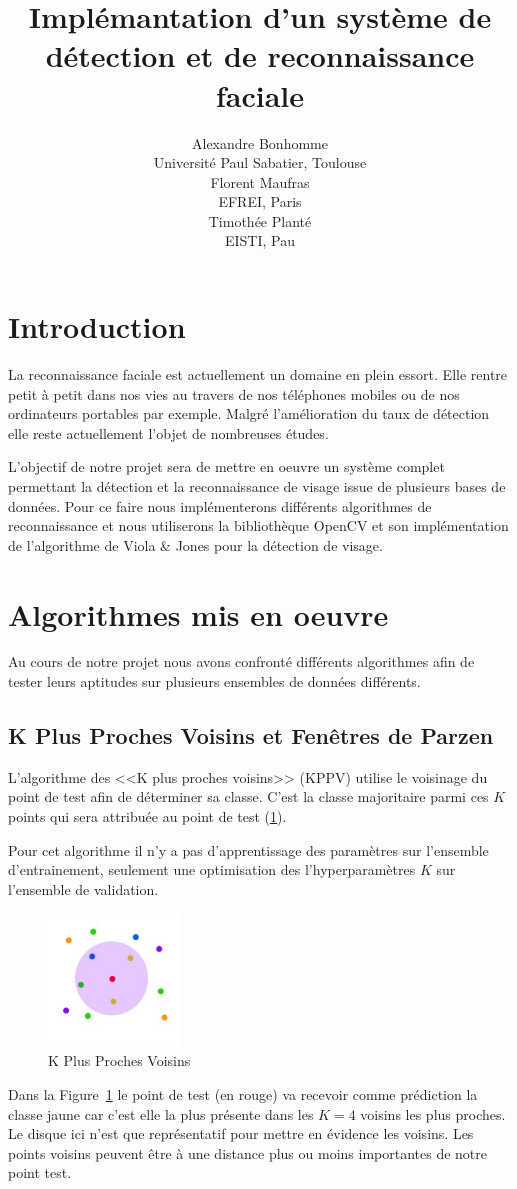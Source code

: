 \documentclass[a4paper,10pt,twocolumn]{extarticle}
\title{\textsf{Implémantation d’un système de détection et de reconnaissance faciale}}
\author{Alexandre Bonhomme\\ {\normalsize Université Paul Sabatier, Toulouse}\\
Florent Maufras\\ {\normalsize EFREI, Paris}\\
Timothée Planté\\ {\normalsize EISTI, Pau}\\}%
\date{}
\begin{document}
\maketitle
\section{Introduction}
La reconnaissance faciale est actuellement un domaine en plein essort. Elle rentre petit à petit dans nos vies au travers de nos téléphones mobiles ou de nos ordinateurs portables par exemple. Malgré l'amélioration du taux de détection elle reste actuellement l'objet de nombreuses études.

L'objectif de notre projet sera de mettre en oeuvre un système complet permettant la détection et la reconnaissance de visage issue de plusieurs bases de données. Pour ce faire nous implémenterons différents algorithmes de reconnaissance et nous utiliserons la bibliothèque OpenCV \cite{opencv} et son implémentation de l'algorithme de Viola \& Jones pour la détection de visage.

\section{Algorithmes mis en oeuvre}
Au cours de notre projet nous avons confronté différents algorithmes afin de tester leurs aptitudes sur plusieurs ensembles de données différents.

\subsection{K Plus Proches Voisins et Fenêtres de Parzen}
L'algorithme des <<K plus proches voisins>> (KPPV) utilise le voisinage du point de test afin de déterminer sa classe. C'est la classe majoritaire parmi ces $K$ points qui sera attribuée au point de test (\ref{fig:knn}).

Pour cet algorithme il n'y a pas d'apprentissage des paramètres sur l'ensemble d'entrainement, seulement une optimisation des l'hyperparamètres $K$ sur l'ensemble de validation.
\begin{figure}[H]
  \begin{center}
    \includegraphics[width=100pt]{images_rapport/KNN.png}
    \caption{K Plus Proches Voisins}
    \label{fig:knn}
  \end{center}
\end{figure}
Dans la Figure~\ref{fig:knn} le point de test (en rouge) va recevoir comme prédiction la classe jaune car c'est elle la plus présente dans les $K = 4$ voisins les plus proches. Le disque ici n'est que représentatif pour mettre en évidence les voisins. Les points voisins peuvent être à une distance plus ou moins importantes de notre point test.
\end{document}
